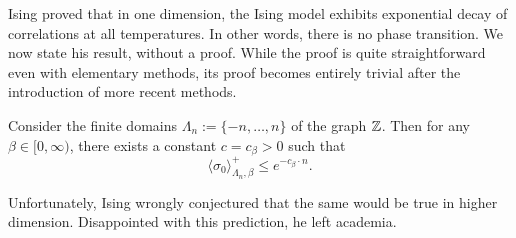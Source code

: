 Ising proved that in one dimension, the Ising model exhibits exponential decay of correlations at all temperatures.
In other words, there is no phase transition.
We now state his result, without a proof.
While the proof is quite straightforward even with elementary methods,
its proof becomes entirely trivial after the introduction of more recent methods.

\begin{theorem}[Ising, 1924]
    Consider the finite domains $\Lambda_n:=\{-n,\dots,n\}$ of the graph $\mathbb Z$.
    Then for any $\beta\in[0,\infty)$,
    there exists a constant $c=c_\beta>0$ such that
    \[
        \langle\sigma_0\rangle_{\Lambda_n,\beta}^+
        \leq e^{-c_\beta\cdot n}.
    \]
\end{theorem}

Unfortunately, Ising wrongly conjectured that the same would be true in higher dimension.
Disappointed with this prediction, he left academia.
